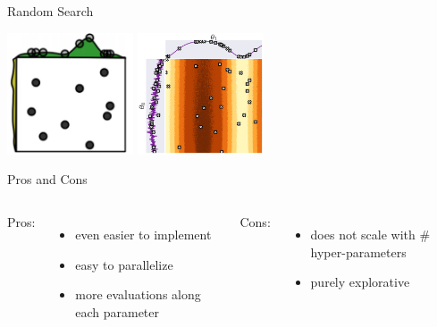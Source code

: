 \begin{frame}[c,fragile]{Random Search }

\begin{center}
\includegraphics[width=0.28\textwidth]{images/random_search}%
\includegraphics[width=0.28\textwidth]{images/rs}
\end{center}

\begin{block}{Pros and Cons}

\pause

\begin{columns}
Pros:
\begin{itemize}
  \item even easier to implement
  \item easy to parallelize 
  \item more evaluations along each parameter
\end{itemize}

Cons:
\begin{itemize}
  \item does not scale with $\#$hyper-parameters
  \item purely explorative
\end{itemize}


\end{columns}

\end{block}

\end{frame}

